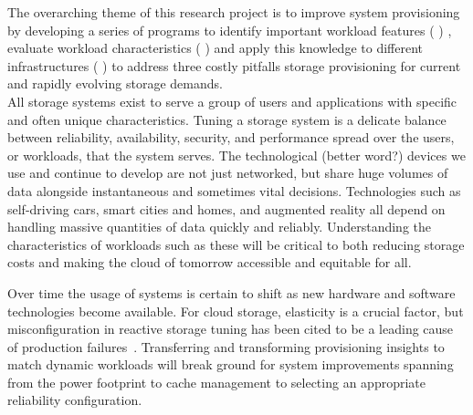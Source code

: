 The overarching theme of this research project is
to improve system provisioning by developing a series of programs to identify important workload features (%
)
, evaluate workload characteristics (%
)
and apply this knowledge to different infrastructures (%
) to address three costly pitfalls storage provisioning for current and rapidly evolving storage demands.\\ 


All storage systems exist to serve a group of users and applications with specific and often unique characteristics.
Tuning a storage system is a delicate
balance between reliability, availability, security, and performance spread over the
users, or workloads, that the system serves. 
 The technological (better word?) devices we use and continue to develop are not just networked, but
share huge volumes of data alongside instantaneous and sometimes vital decisions.
Technologies such as self-driving cars, smart cities and homes, and augmented
reality all depend on handling massive quantities of data quickly and reliably.
Understanding the characteristics of workloads such as these will be critical to both
reducing storage costs and making the cloud of tomorrow accessible and equitable
for all.

%

%


  Over time the usage of systems is certain to shift as new hardware and
  software technologies  become available.
  For cloud storage, elasticity is a
crucial factor, but misconfiguration in reactive storage tuning has been cited
to be a leading cause of production failures~\cite{yin2011empirical}.  
  Transferring and transforming
  provisioning insights to match dynamic workloads will break ground for system
  improvements spanning from the power footprint to cache management to
  selecting an appropriate reliability configuration. 



